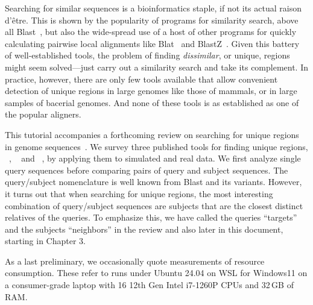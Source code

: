 Searching for similar sequences is a bioinformatics staple, if not its
actual raison d'\^etre. This is shown by the popularity of programs
for similarity search, above all Blast~\cite{alt90:bas,alt97:gap}, but
also the wide-spread use of a host of other programs for quickly
calculating pairwise local alignments like Blat~\cite{ken02:bla} and
BlastZ~\cite{sch03:hum}. Given this battery of well-established tools,
the problem of finding \emph{dissimilar}, or unique, regions might
seem solved---just carry out a similarity search and take its
complement. In practice, however, there are only few tools available
that allow convenient detection of unique regions in large genomes
like those of mammals, or in large samples of bacerial genomes. And
none of these tools is as established as one of the popular aligners.

This tutorial accompanies a forthcoming review on searching for
unique regions in genome sequences~\cite{vie25:fas}. We survey three
published tools for finding unique
regions, ~\cite{poc20:gen}, ~\cite{pir19:hig}
and ~\cite{hau21:fur,vie24:mar}, by applying them to simulated
and real data. We first analyze single query sequences before
comparing pairs of query and subject sequences. The query/subject
nomenclature is well known from Blast and its variants. However, it
turns out that when searching for unique regions, the most interesting
combination of query/subject sequences are subjects that are the
closest distinct relatives of the queries. To emphasize this, we have
called the queries ``targets'' and the subjects ``neighbors'' in the
review and also later in this document, starting in Chapter 3.

As a last preliminary, we occasionally quote measurements of resource
consumption. These refer to runs under Ubuntu 24.04 on WSL for
Windows11 on a consumer-grade laptop with 16 12th Gen Intel i7-1260P
CPUs and 32\,GB of RAM.
